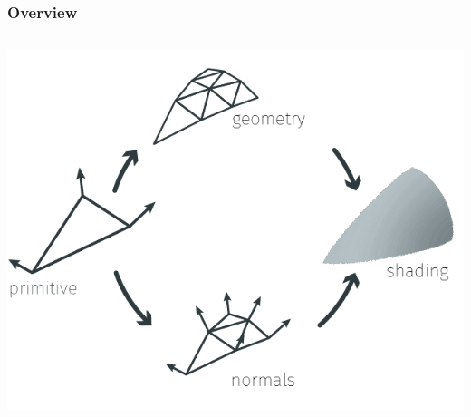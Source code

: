 \begin{frame}\frametitle{Overview}
	\begin{columns}
		\begin{column}{0.9\textwidth}
			\begin{center}
				\includegraphics[width=\textwidth]{./img/1_single/recap_overview.png}
			\end{center}		
		\end{column}
	\end{columns}
\end{frame}	
